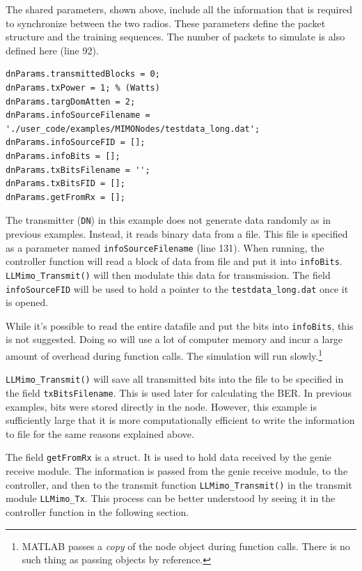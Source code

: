 The shared parameters, shown above, include all the information that
is required to synchronize between the two radios.  These parameters
define the packet structure and the training sequences.  The number
of packets to simulate is also defined here (line 92).

\begin{lstlisting}[name=llmimoBuild]
% DN-specific (Transmitter) parameters
dnParams.transmittedBlocks = 0;
dnParams.txPower = 1; % (Watts)
dnParams.targDomAtten = 2;
dnParams.infoSourceFilename = './user_code/examples/MIMONodes/testdata_long.dat';
dnParams.infoSourceFID = [];
dnParams.infoBits = [];
dnParams.txBitsFilename = '';
dnParams.txBitsFID = [];
dnParams.getFromRx = [];

\end{lstlisting}

The transmitter (\verb+DN+) in this example does not generate data
randomly as in previous examples.  Instead, it reads binary data
from a file.  This file is specified as a parameter named
\verb+infoSourceFilename+ (line 131).  When running, the controller
function will read a block of data from file and put it into
\verb+infoBits+. \verb+LLMimo_Transmit()+ will then modulate this
data for transmission. The field \verb+infoSourceFID+ will be used
to hold a pointer to the \verb+testdata_long.dat+ once it is opened.

While it's possible to read the entire datafile and put the bits
into \verb+infoBits+, this is not suggested.  Doing so will use a
lot of computer memory and incur a large amount of overhead during
function calls. The simulation will run slowly.\footnote{MATLAB
passes a \emph{copy} of the node object during function calls. There
is no such thing as passing objects by reference.}

\verb+LLMimo_Transmit()+ will save all transmitted bits into the
file to be specified in the field \verb+txBitsFilename+.  This is
used later for calculating the BER.  In previous examples, bits were
stored directly in the node.  However, this example is sufficiently
large that it is more computationally efficient to write the
information to file for the same reasons explained above.

The field \verb+getFromRx+ is a struct.  It is used to hold data
received by the genie receive module.  The information is passed
from the genie receive module, to the controller, and then to the
transmit function \verb+LLMimo_Transmit()+ in the transmit module
\verb+LLMimo_Tx+.  This process can be better understood by seeing
it in the controller function in the following section.

